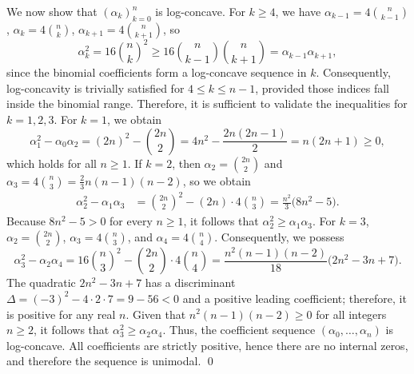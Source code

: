 \documentclass[12pt,twoside]{article}
\renewenvironment{proof}{{\noindent\bfseries Proof.}}{\qed}
\begin{document}
\begin{proof}
			 We now show that $(\alpha_k)_{k=0}^n$ is log-concave.  For $k\ge 4$, we have $\alpha_{k-1}=4\binom{n}{k-1}$, $\alpha_k=4\binom{n}{k}$,
			$\alpha_{k+1}=4\binom{n}{k+1}$, so
			\[
			\alpha_k^2  =  16\binom{n}{k}^2
			 \ge  16\binom{n}{k-1}\binom{n}{k+1}
			 =  \alpha_{k-1}\alpha_{k+1},
			\]
			since the binomial coefficients form a log-concave sequence in $k$. Consequently, log-concavity is trivially satisfied for \(4 \leq k \leq n-1\), provided those indices fall inside the binomial range. Therefore, it is sufficient to validate the inequalities for $k=1,2,3$. For \( k=1 \), we obtain
			\[
			\alpha_1^2 - \alpha_0\alpha_2 = (2n)^2 - \binom{2n}{2} = 4n^2 - \frac{2n(2n-1)}{2} 
			= n(2n+1)\ge 0,
			\]
			which holds for all $n\ge 1$. If $k=2$, then $\alpha_2=\binom{2n}{2}$ and
			$\alpha_3=4\binom{n}{3}=\frac{2}{3}n(n-1)(n-2)$, so we obtain
			\begin{align*}
				\alpha_2^2 - \alpha_1\alpha_3
				&= \binom{2n}{2}^2 - (2n)\cdot 4\binom{n}{3} = \frac{n^2}{3}\bigl(8n^2 - 5\bigr).
			\end{align*}
			Because $8n^2-5>0$ for every $n\ge 1$, it follows that $\alpha_2^2\ge \alpha_1\alpha_3$. For \( k=3 \), \( \alpha_2 = \binom{2n}{2} \), \( \alpha_3 = 4\binom{n}{3} \), and \( \alpha_4 = 4\binom{n}{4} \). Consequently, we possess
			\[
			\alpha_3^2 - \alpha_2\alpha_4
			= 16\binom{n}{3}^2 - \binom{2n}{2}\cdot 4\binom{n}{4}
			= \frac{n^2(n-1)(n-2)}{18}\bigl(2n^2 - 3n + 7\bigr).
			\]
			The quadratic \(2n^2 - 3n + 7\) has a discriminant \(\Delta = (-3)^2 - 4 \cdot 2 \cdot 7 = 9 - 56 < 0\) and a positive leading coefficient; therefore, it is positive for any real \(n\). Given that $n^2(n-1)(n-2)\ge 0$ for all integers $n\ge 2$, it follows that $\alpha_3^2\ge \alpha_2\alpha_4$.  Thus, the coefficient sequence $(\alpha_0,\dots,\alpha_n)$ is log-concave. All coefficients
			are strictly positive, hence there are no internal zeros, and therefore the sequence is unimodal.
		\end{proof}
		
		
		
		
		
		
		
		
		
		
		
\end{document}
